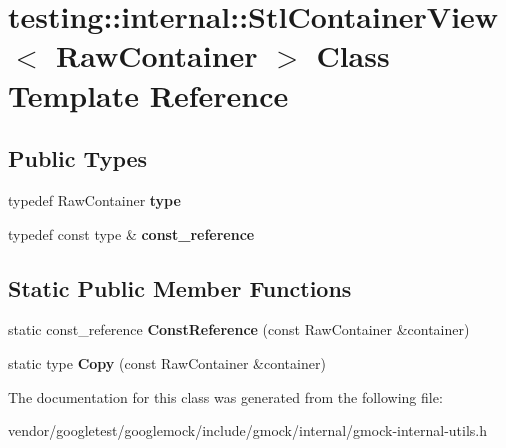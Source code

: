 \hypertarget{classtesting_1_1internal_1_1_stl_container_view}{}\section{testing\+:\+:internal\+:\+:Stl\+Container\+View$<$ Raw\+Container $>$ Class Template Reference}
\label{classtesting_1_1internal_1_1_stl_container_view}
\subsection*{Public Types}
\begin{DoxyCompactItemize}
\item 
\mbox{\label{classtesting_1_1internal_1_1_stl_container_view_a2b2c63a6dcdbfe63fb0ee121ebf463ba}} 
typedef Raw\+Container {\bfseries type}
\item 
\mbox{\label{classtesting_1_1internal_1_1_stl_container_view_a9cd4f6ed689b3938cdb7b3c4cbf1b36b}} 
typedef const type \& {\bfseries const\+\_\+reference}
\end{DoxyCompactItemize}
\subsection*{Static Public Member Functions}
\begin{DoxyCompactItemize}
\item 
\mbox{\label{classtesting_1_1internal_1_1_stl_container_view_a36eccf53329730f6e55c12002128bf25}} 
static const\+\_\+reference {\bfseries Const\+Reference} (const Raw\+Container \&container)
\item 
\mbox{\label{classtesting_1_1internal_1_1_stl_container_view_a441123838221f1284873f66ed968f279}} 
static type {\bfseries Copy} (const Raw\+Container \&container)
\end{DoxyCompactItemize}


The documentation for this class was generated from the following file\+:\begin{DoxyCompactItemize}
\item 
vendor/googletest/googlemock/include/gmock/internal/gmock-\/internal-\/utils.\+h\end{DoxyCompactItemize}
